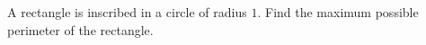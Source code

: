 A rectangle is inscribed in a circle of radius $1$. Find the maximum possible perimeter of the rectangle.
